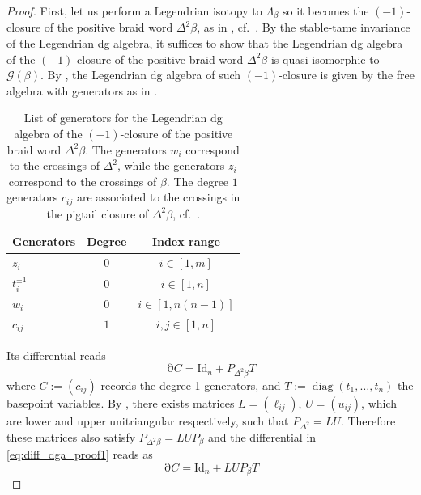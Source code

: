 \documentclass[11pt]{article}
\newcommand{\La}{\Lambda}
\newcommand{\diag}{\operatorname{diag}}
\newcommand{\cG}{\mathcal G}
\newcommand{\dd}{\operatorname{\partial}}
\begin{document}
\begin{proof}
First, let us perform a Legendrian isotopy to $\La_\beta$ so it becomes the $(-1)$-closure of the positive braid word $\Delta^2\beta$, as in , cf.~\cite[Section 2.2]{CasalsNg}. By the stable-tame invariance of the Legendrian dg algebra, it suffices to show that the Legendrian dg algebra of the $(-1)$-closure of the positive braid word $\Delta^2\beta$ is quasi-isomorphic to $\cG(\beta)$. By \cite[Prop.~5.2]{CasalsNg}, the Legendrian dg algebra of such $(-1)$-closure is given by the free algebra with generators as in .

\begin{table}[htpb]
    \centering
    \begin{tabular}{lcc}
        \toprule
        \textbf{Generators} & \textbf{Degree} & \textbf{Index range} \\
        \midrule
        $z_{i}$ & 0 & $i\in [1,m]$ \\
        $t_i^{\pm1}$ & 0 & $i\in [1,n]$ \\
        $w_i$ & 0 & $i\in[1,n(n-1)]$ \\
        $c_{ij}$ & $1$ & $i,j\in [1,n]$ \\
        \bottomrule
    \end{tabular}
    \caption{List of generators for the Legendrian dg algebra of the $(-1)$-closure of the positive braid word $\Delta^2\beta$. The generators $w_i$ correspond to the crossings of $\Delta^2$, while the generators $z_i$ correspond to the crossings of $\beta$. The degree $1$ generators $c_{ij}$ are associated to the crossings in the pigtail closure of $\Delta^2\beta$, cf.~\cite[Section 2.2]{CasalsNg}.}
    \label{tab:generators2}
\end{table}
\noindent Its differential reads
\begin{equation}\label{eq:diff_dga_proof1}
\dd C=\mbox{Id}_n+P_{\Delta^2\beta}T
\end{equation}
where $C:=(c_{ij})$ records the degree 1 generators, and $T:=\diag(t_1,\ldots,t_n)$ the basepoint variables. By \cite[Lemma 2.3]{CGGS24}, there exists matrices $L=(\ell_{ij})$, $U=(u_{ij})$, which are lower and upper unitriangular respectively, such that $P_{\Delta^2}=LU$. Therefore these matrices also satisfy $P_{\Delta^2\beta}=LUP_{\beta}$ and the differential in \eqref{eq:diff_dga_proof1} reads as
\begin{equation}\label{eq:diff_dga_proof2}
\dd C=\mbox{Id}_n+LUP_{\beta}T
\end{equation}

\end{proof}
\end{document}
